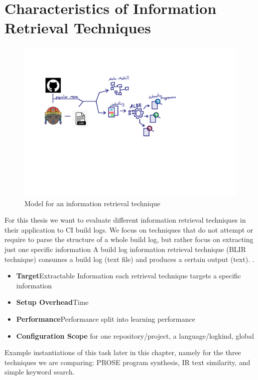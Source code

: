 \documentclass[\myrootdir/main.tex]{subfiles}
\begin{document}
\section{Characteristics of Information Retrieval Techniques}
\begin{figure}[h]
	\centering
	\includegraphics[page=3, width=\textwidth, trim={0.5cm 0.5cm 0.5cm 0.5cm}, clip]{img/flow-of-research.pdf}
	\caption{Model for an information retrieval technique}
	\label{fig:model-ie-technique}
\end{figure}
For this thesis we want to evaluate different information retrieval techniques in their application to CI build logs. We focus on techniques that do not attempt or require to parse the structure of a whole build log, but rather focus on extracting just one specific information
A build log information retrieval technique (BLIR technique) consumes a build log (text file) and produces a certain output (text). .
\begin{itemize}
	\item \textbf{Target}{Extractable Information} each retrieval technique  targets a specific information
	\item \textbf{Setup Overhead}{Time}
	\item \textbf{Performance}{Performance} split into learning performance
	\item \textbf{Configuration Scope} for one repository/project, a language/logkind, global
\end{itemize}

Example instantiations of this task later in this chapter, namely for the three techniques we are comparing: PROSE program synthesis, IR text similarity, and simple keyword search. 
\end{document}
